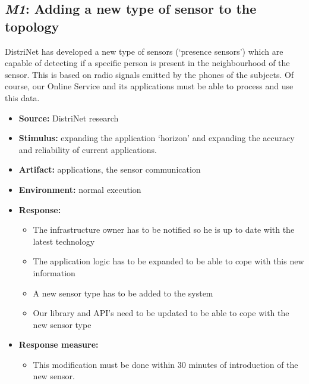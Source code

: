 \documentclass[english]{sareport}
\begin{document}
\subsection{\emph{M1}: Adding a new type of sensor to the topology}
DistriNet has developed a new type of sensors (`presence sensors') which are capable of detecting if a specific person is present in the neighbourhood  of the sensor. This is based on radio signals emitted by the phones of the subjects. Of course, our Online Service and its applications must be able to process and use this data.
\begin{itemize}
    \item \textbf{Source:} DistriNet research
    \item \textbf{Stimulus:} expanding the application `horizon' and expanding the accuracy and reliability of current applications.
    \item \textbf{Artifact:} applications, the sensor communication
    \item \textbf{Environment:} normal execution
    \item \textbf{Response:}
        \begin{itemize}
        	\item The infrastructure owner has to be notified so he is up to date with the latest technology
            \item The application logic has to be expanded to be able to cope with this new information
            \item A new sensor type has to be added to the system
            \item Our library and API's need to be updated to be able to cope with the new sensor type
        \end{itemize}

    \item \textbf{Response measure:}
        \begin{itemize}
            \item This modification must be done within 30 minutes of introduction of the new sensor.
        \end{itemize}
\end{itemize}
\end{document}
